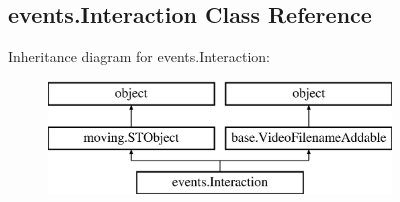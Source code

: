\hypertarget{classevents_1_1Interaction}{\subsection{events.\-Interaction Class Reference}
\label{classevents_1_1Interaction}
}
Inheritance diagram for events.\-Interaction\-:\begin{figure}[H]
\begin{center}
\leavevmode
\includegraphics[height=3.000000cm]{classevents_1_1Interaction}
\end{center}
\end{figure}
